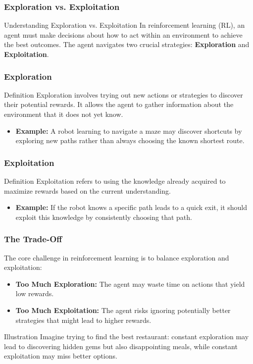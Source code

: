 \documentclass[aspectratio=169]{beamer}
\begin{document}
\begin{frame}[fragile]
    \frametitle{Exploration vs. Exploitation}
    \begin{block}{Understanding Exploration vs. Exploitation}
        In reinforcement learning (RL), an agent must make decisions about how to act within an environment to achieve the best outcomes. The agent navigates two crucial strategies: \textbf{Exploration} and \textbf{Exploitation}.
    \end{block}
\end{frame}

\begin{frame}[fragile]
    \frametitle{Exploration}
    \begin{block}{Definition}
        Exploration involves trying out new actions or strategies to discover their potential rewards. It allows the agent to gather information about the environment that it does not yet know.
    \end{block}
    \begin{itemize}
        \item \textbf{Example:} A robot learning to navigate a maze may discover shortcuts by exploring new paths rather than always choosing the known shortest route.
    \end{itemize}
\end{frame}

\begin{frame}[fragile]
    \frametitle{Exploitation}
    \begin{block}{Definition}
        Exploitation refers to using the knowledge already acquired to maximize rewards based on the current understanding.
    \end{block}
    \begin{itemize}
        \item \textbf{Example:} If the robot knows a specific path leads to a quick exit, it should exploit this knowledge by consistently choosing that path.
    \end{itemize}
\end{frame}

\begin{frame}[fragile]
    \frametitle{The Trade-Off}
    The core challenge in reinforcement learning is to balance exploration and exploitation:
    
    \begin{itemize}
        \item \textbf{Too Much Exploration:} The agent may waste time on actions that yield low rewards.
        \item \textbf{Too Much Exploitation:} The agent risks ignoring potentially better strategies that might lead to higher rewards.
    \end{itemize}
    
    \begin{block}{Illustration}
        Imagine trying to find the best restaurant: constant exploration may lead to discovering hidden gems but also disappointing meals, while constant exploitation may miss better options.
    \end{block}
\end{frame}
\end{document}

